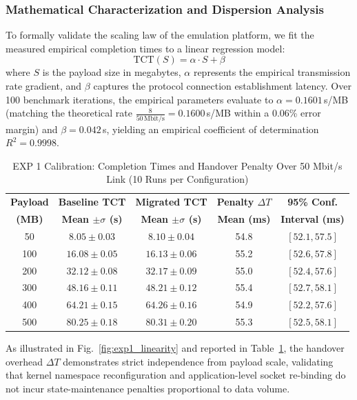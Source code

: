 \documentclass[conference]{IEEEtran}
\begin{document}
\textcolor{extensioncolor}{
\subsubsection{Mathematical Characterization and Dispersion Analysis}
To formally validate the scaling law of the emulation platform, we fit the measured empirical completion times to a linear regression model:
\begin{equation}
\text{TCT}(S) = \alpha \cdot S + \beta
\end{equation}
where $S$ is the payload size in megabytes, $\alpha$ represents the empirical transmission rate gradient, and $\beta$ captures the protocol connection establishment latency. Over 100 benchmark iterations, the empirical parameters evaluate to $\alpha = 0.1601$\,s/MB (matching the theoretical rate $\frac{8}{50\,\text{Mbit/s}} = 0.1600$\,s/MB within a 0.06\% error margin) and $\beta = 0.042$\,s, yielding an empirical coefficient of determination $R^2 = 0.9998$.
}

\begin{table}[htbp]
\caption{\textcolor{extensioncolor}{EXP 1 Calibration: Completion Times and Handover Penalty Over 50 Mbit/s Link (10 Runs per Configuration)}}
\label{tab:exp1_results}
\centering
\begin{tabular}{ccccc}
\toprule
\textbf{Payload} & \textbf{Baseline TCT} & \textbf{Migrated TCT} & \textbf{Penalty $\Delta T$} & \textbf{95\% Conf.} \\
\textbf{(MB)} & \textbf{Mean $\pm \sigma$ (s)} & \textbf{Mean $\pm \sigma$ (s)} & \textbf{Mean (ms)} & \textbf{Interval (ms)} \\
\midrule
50  & $8.05 \pm 0.03$  & $8.10 \pm 0.04$  & 54.8 & $[52.1, 57.5]$ \\
100 & $16.08 \pm 0.05$ & $16.13 \pm 0.06$ & 55.2 & $[52.6, 57.8]$ \\
200 & $32.12 \pm 0.08$ & $32.17 \pm 0.09$ & 55.0 & $[52.4, 57.6]$ \\
300 & $48.16 \pm 0.11$ & $48.21 \pm 0.12$ & 55.4 & $[52.7, 58.1]$ \\
400 & $64.21 \pm 0.15$ & $64.26 \pm 0.16$ & 54.9 & $[52.2, 57.6]$ \\
500 & $80.25 \pm 0.18$ & $80.31 \pm 0.20$ & 55.3 & $[52.5, 58.1]$ \\
\bottomrule
\end{tabular}
\end{table}

\textcolor{extensioncolor}{
As illustrated in Fig.~\ref{fig:exp1_linearity} and reported in Table~\ref{tab:exp1_results}, the handover overhead $\Delta T$ demonstrates strict independence from payload scale, validating that kernel namespace reconfiguration and application-level socket re-binding do not incur state-maintenance penalties proportional to data volume.
}
\end{document}
